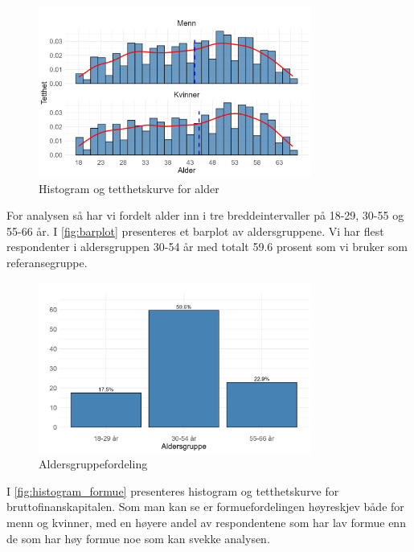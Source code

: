 \documentclass[
  12pt,
  a4paper,
  DIV=11,
  numbers=noendperiod]{scrartcl}
\begin{document}
\begin{figure}[H]
\caption{Histogram og tetthetskurve for alder}
\label{fig:histogram}
\centering
\includegraphics[width=0.8\textwidth]{dokumentobjekter/figurer/fig_2.png}
\end{figure}

\newpage

For analysen så har vi fordelt alder inn i tre breddeintervaller på
18-29, 30-55 og 55-66 år. I \autoref{fig:barplot} presenteres et barplot
av aldersgruppene. Vi har flest respondenter i aldersgruppen 30-54 år
med totalt 59.6 prosent som vi bruker som referansegruppe.

\begin{figure}[H]
\caption{Aldersgruppefordeling}
\label{fig:barplot}
\centering
\includegraphics[width=0.8\textwidth]{dokumentobjekter/figurer/fig_3.png}
\end{figure}

I \autoref{fig:histogram_formue} presenteres histogram og tetthetskurve
for bruttofinanskapitalen. Som man kan se er formuefordelingen
høyreskjev både for menn og kvinner, med en høyere andel av
respondentene som har lav formue enn de som har høy formue noe som kan
svekke analysen.
\end{document}
